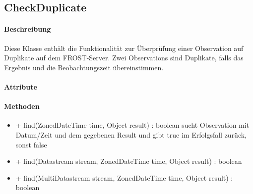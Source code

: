 \subsection{CheckDuplicate}

\paragraph{Beschreibung}
Diese Klasse enthält die Funktionalität zur Überprüfung einer Observation auf Duplikate auf dem FROST-Server.
Zwei Observations sind Duplikate, falls das Ergebnis und die Beobachtungszeit übereinstimmen.

\paragraph{Attribute}

\paragraph{Methoden}
\begin{itemize}
\item + find(ZonedDateTime time, Object result) : boolean
sucht Observation mit Datum/Zeit und dem gegebenen Result und gibt true im Erfolgsfall zurück, sonst false
\item + find(Datastream stream, ZonedDateTime time, Object result) : boolean
\item + find(MultiDatastream stream, ZonedDateTime time, Object result) : boolean
\end{itemize}